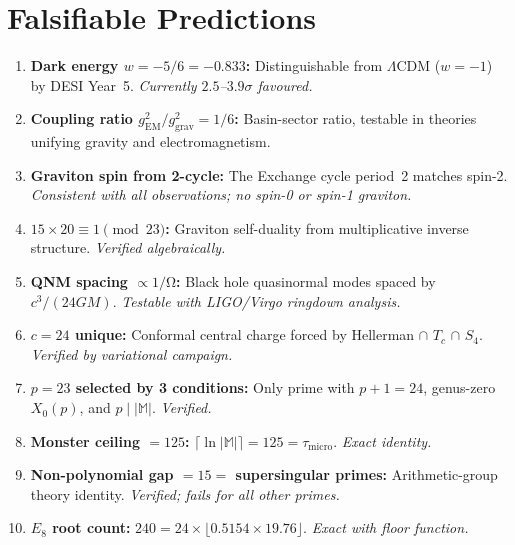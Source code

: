 \documentclass[12pt,a4paper]{article}
\theoremstyle{definition}\newtheorem{definition}[theorem]{Definition}
\theoremstyle{remark}\newtheorem{remark}[theorem]{Remark}
\renewcommand{\O}{\mathrm{\Omega}}
\newcommand{\Monster}{\mathbb{M}}\newcommand{\Leech}{\Lambda_{24}}
\begin{document}
\section{Falsifiable Predictions}
\label{sec:predictions}

\begin{enumerate}
  \item \textbf{Dark energy $w = -5/6 = -0.833$:}
  Distinguishable from $\Lambda$CDM ($w = -1$) by DESI Year~5.
  \emph{Currently $2.5$--$3.9\sigma$ favoured.}

  \item \textbf{Coupling ratio $g_{\mathrm{EM}}^2/g_{\mathrm{grav}}^2 = 1/6$:}
  Basin-sector ratio, testable in theories unifying gravity and electromagnetism.

  \item \textbf{Graviton spin from 2-cycle:} The Exchange cycle period~2 matches
  spin-2. \emph{Consistent with all observations; no spin-0 or spin-1 graviton.}

  \item \textbf{$15 \times 20 \equiv 1 \pmod{23}$:} Graviton self-duality from
  multiplicative inverse structure. \emph{Verified algebraically.}

  \item \textbf{QNM spacing $\propto 1/\O$:} Black hole quasinormal modes
  spaced by $c^3/(24GM)$. \emph{Testable with LIGO/Virgo ringdown analysis.}

  \item \textbf{$c = 24$ unique:} Conformal central charge forced by
  Hellerman $\cap$ $T_c$ $\cap$ $S_4$. \emph{Verified by variational campaign.}

  \item \textbf{$p = 23$ selected by 3 conditions:} Only prime with
  $p + 1 = 24$, genus-zero $X_0(p)$, and $p \mid |\Monster|$. \emph{Verified.}

  \item \textbf{Monster ceiling $= 125$:} $\lceil\ln|\Monster|\rceil = 125 =
  \tau_{\mathrm{micro}}$. \emph{Exact identity.}

  \item \textbf{Non-polynomial gap $= 15 =$ supersingular primes:}
  Arithmetic-group theory identity. \emph{Verified; fails for all other primes.}

  \item \textbf{$E_8$ root count:} $240 = 24 \times \lfloor 0.5154 \times 19.76
  \rfloor$. \emph{Exact with floor function.}
\end{enumerate}
\end{document}
